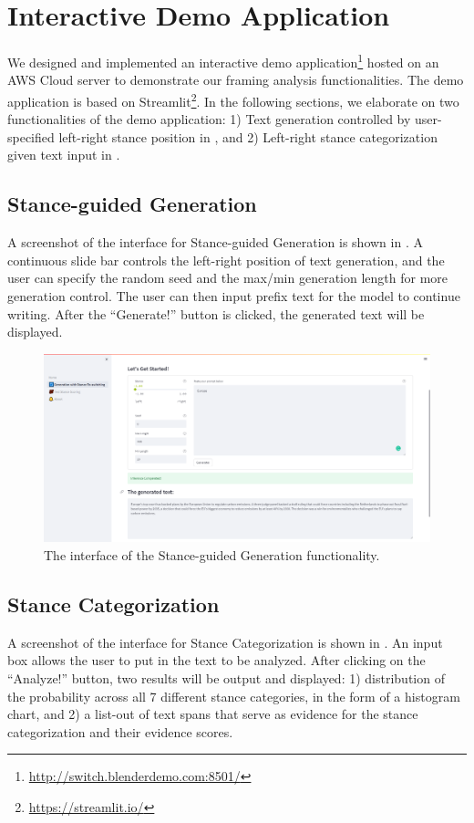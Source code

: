 \chapter{Interactive Demo Application}
We designed and implemented an interactive demo application\footnote{\url{http://switch.blenderdemo.com:8501/}} hosted on an AWS Cloud server to demonstrate our framing analysis functionalities. The demo application is based on Streamlit\footnote{\url{https://streamlit.io/}}. In the following sections, we elaborate on two functionalities of the demo application: 1) Text generation controlled by user-specified left-right stance position in , and 2) Left-right stance categorization given text input in .


\section{Stance-guided Generation}
\label{demo-generation}
A screenshot of the interface for Stance-guided Generation is shown in . A continuous slide bar controls the left-right position of text generation, and the user can specify the random seed and the max/min generation length for more generation control. The user can then input prefix text for the model to continue writing. After the ``Generate!'' button is clicked, the generated text will be displayed.


\begin{figure}[ht]
    \centering
    \includegraphics[width=\textwidth]{img/demo-generation}
    \caption{The interface of the Stance-guided Generation functionality.}
    \label{fig:demo-generation}
\end{figure}


\section{Stance Categorization}
\label{demo-detection}
A screenshot of the interface for Stance Categorization is shown in . An input box allows the user to put in the text to be analyzed. After clicking on the ``Analyze!'' button, two results will be output and displayed: 1) distribution of the probability across all 7 different stance categories, in the form of a histogram chart, and 2) a list-out of text spans that serve as evidence for the stance categorization and their evidence scores.


